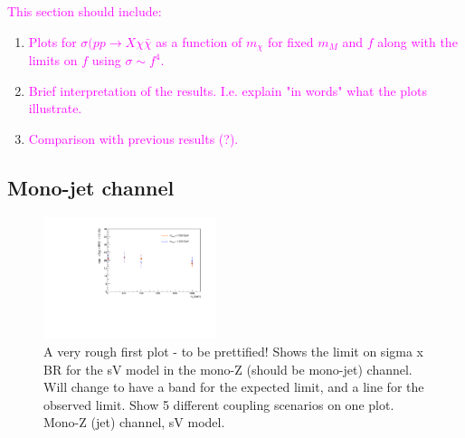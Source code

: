 \begin{flushleft}
\textcolor{magenta}{This section should include:}
\begin{enumerate}
\item \textcolor{magenta}{Plots for $\sigma(pp \rightarrow X \chi \bar{\chi}$ as a function of $m_{\chi}$ for fixed $m_{M}$ and $f$ along with the limits on $f$ using $\sigma \sim f^{4}$.}
\item \textcolor{magenta}{Brief interpretation of the results. I.e. explain "in words" what the plots illustrate.}
\item \textcolor{magenta}{Comparison with previous results (?).}
\end{enumerate}
\end{flushleft}

\subsection{Mono-jet channel}

\begin{figure}[!h]
\begin{center}
\includegraphics[width=0.45\textwidth]{figures/monoZ_sigma_limits_variedDMmass.pdf}
\caption{A very rough first plot - to be prettified! Shows the limit on sigma x BR for the sV model in the mono-Z (should be mono-jet) channel. Will change to have a band for the expected limit, and a line for the observed limit. Show 5 different coupling scenarios on one plot. Mono-Z (jet) channel, sV model.}
\label{fig:MonoZ_SVD_limit}
\end{center}
\end{figure}

